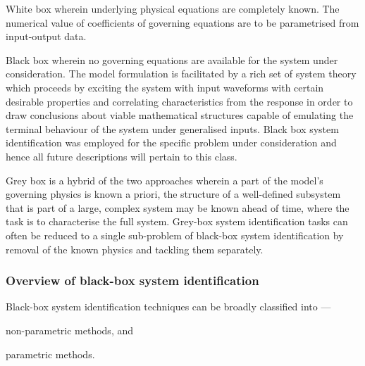 \begin{enumdescriptnum}[leftmargin=!,itemsep=1ex,labelwidth=\widthof{$\symbf{\text{brugg}_j}\ \scriptstyle (\times 3)$abc}
    ,partopsep=0pt
    ,topsep=0pt
    ]

\item[White box] wherein underlying physical equations are completely known. The
numerical value  of coefficients of  governing equations are to  be parametrised
from input-output data.

\item[Black box]  wherein no  governing equations are  available for  the system
under  consideration. The  model formulation  is facilitated  by a  rich set  of
system theory  which proceeds by exciting  the system with input  waveforms with
certain desirable  properties and correlating characteristics  from the response
in order  to draw  conclusions about viable  mathematical structures  capable of
emulating  the  terminal  behaviour  of the  system  under  generalised  inputs.
Black  box system  identification was  employed for  the specific  problem under
consideration and hence all future descriptions will pertain to this class.

\item[Grey box] is a hybrid of the  two approaches wherein a part of the model's
governing  physics is  known a  priori, \eg{}  the structure  of a  well-defined
subsystem  that is  part  of a  large,  complex  system may  be  known ahead  of
time,  where the  task  is  to characterise  the  full  system. Grey-box  system
identification tasks can  often be reduced to a single  sub-problem of black-box
system  identification  by  removal  of  the known  physics  and  tackling  them
separately.

\end{enumdescriptnum}

\subsubsection*{Overview of black-box system identification}
Black-box system identification techniques can be broadly classified into ---
\begin{enumerate*}[label=\emph{\alph*})]
     \item non-parametric methods, and
     \item parametric methods.
 \end{enumerate*}

